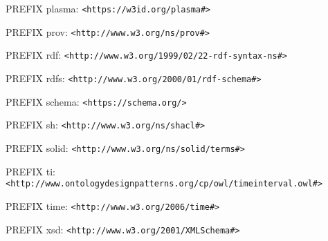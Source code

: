 PREFIX plasma: \texttt{<https://w3id.org/plasma\#>}

PREFIX prov: \texttt{<http://www.w3.org/ns/prov\#>}

PREFIX rdf: \texttt{<http://www.w3.org/1999/02/22-rdf-syntax-ns\#>}

PREFIX rdfs: \texttt{<http://www.w3.org/2000/01/rdf-schema\#>}

PREFIX schema: \texttt{<https://schema.org/>}

PREFIX sh: \texttt{<http://www.w3.org/ns/shacl\#>}

PREFIX solid: \texttt{<http://www.w3.org/ns/solid/terms\#>}

PREFIX ti: \texttt{<http://www.ontologydesignpatterns.org/cp/owl/timeinterval.owl\#>}

PREFIX time: \texttt{<http://www.w3.org/2006/time\#>}

PREFIX xsd: \texttt{<http://www.w3.org/2001/XMLSchema\#>}